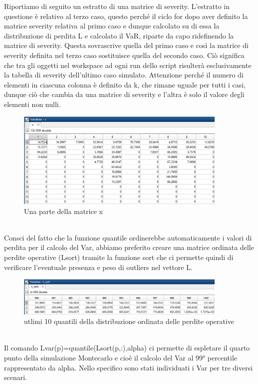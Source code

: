 \documentclass[titlepage]{article}
\begin{document}
\begin{itemize}
Riportiamo di seguito un estratto di una matrice di severity. L’estratto in questione è relativo al terzo caso, questo perché il ciclo for dopo aver definito la matrice severity relativa al primo caso e dunque calcolato su di essa la distribuzione di perdita L e calcolato il VaR, riparte da capo ridefinendo la matrice di severity. Questa sovrascrive quella del primo caso e così la matrice di severity definita nel terzo caso sostituisce quella del secondo caso. Ciò significa che tra gli oggetti nel workspace ad ogni run dello script risulterà esclusivamente la tabella di severity dell’ultimo caso simulato. Attenzione perché il numero di elementi in ciascuna colonna è definito da k, che rimane uguale per tutti i casi, dunque ciò che cambia da una matrice di severity e l’altra è solo il valore degli elementi non nulli.
\\
\begin{figure}[top]
	\centering
	\includegraphics[width=0.9\textwidth]{severity.png}
	\caption{\label{fig:severity.png}Una parte della matrice x}
\end{figure}
\\
Consci del fatto che la funzione quantile ordinerebbe automaticamente i valori di perdita per il calcolo del Var, abbiamo preferito creare una matrice ordinata delle perdite operative (Lsort) tramite la funzione sort che ci permette quindi di verificare l’eventuale presenza e peso di outliers nel vettore L.\\



\begin{figure}[htbp]
	\centering
	\includegraphics[width=0.9\textwidth]{losss.png}
	\caption{\label{fig:losss.png}utlimi 10 quantili della distribuzione ordinata delle perdite operative}
\end{figure}
\\
Il comando Lvar(p)=quantile(Lsort(p,:),alpha) ci permette di espletare il quarto punto della simulazione Montecarlo e cioè il calcolo del Var al 99° percentile rappresentato da alpha. Nello specifico sono stati individuati i Var per tre diversi scenari. 
\\


\end{itemize}
\end{document}
